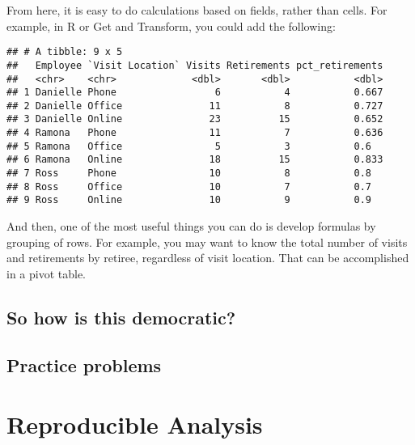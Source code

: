 \documentclass[]{book}
\newenvironment{Shaded}{\begin{snugshade}}{\end{snugshade}}
\newcommand{\KeywordTok}[1]{\textcolor[rgb]{0.13,0.29,0.53}{\textbf{#1}}}
\newcommand{\DataTypeTok}[1]{\textcolor[rgb]{0.13,0.29,0.53}{#1}}
\newcommand{\StringTok}[1]{\textcolor[rgb]{0.31,0.60,0.02}{#1}}
\newcommand{\OperatorTok}[1]{\textcolor[rgb]{0.81,0.36,0.00}{\textbf{#1}}}
\newcommand{\NormalTok}[1]{#1}
\begin{document}
From here, it is easy to do calculations based on fields, rather than
cells. For example, in R or Get and Transform, you could add the
following:

\begin{Shaded}
\end{Shaded}

\begin{verbatim}
## # A tibble: 9 x 5
##   Employee `Visit Location` Visits Retirements pct_retirements
##   <chr>    <chr>             <dbl>       <dbl>           <dbl>
## 1 Danielle Phone                 6           4           0.667
## 2 Danielle Office               11           8           0.727
## 3 Danielle Online               23          15           0.652
## 4 Ramona   Phone                11           7           0.636
## 5 Ramona   Office                5           3           0.6  
## 6 Ramona   Online               18          15           0.833
## 7 Ross     Phone                10           8           0.8  
## 8 Ross     Office               10           7           0.7  
## 9 Ross     Online               10           9           0.9
\end{verbatim}

And then, one of the most useful things you can do is develop formulas
by grouping of rows. For example, you may want to know the total number
of visits and retirements by retiree, regardless of visit location. That
can be accomplished in a pivot table.

\section{So how is this democratic?}\label{so-how-is-this-democratic}

\section{Practice problems}\label{practice-problems}

\chapter{Reproducible Analysis}\label{reproducible-analysis}
\end{document}
